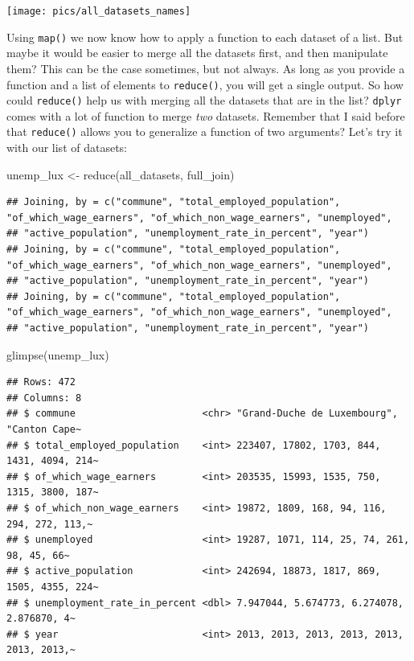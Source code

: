 \documentclass[
]{article}
\newenvironment{Shaded}{\begin{snugshade}}{\end{snugshade}}
\newcommand{\FunctionTok}[1]{\textcolor[rgb]{0.00,0.00,0.00}{#1}}
\newcommand{\NormalTok}[1]{#1}
\newcommand{\OtherTok}[1]{\textcolor[rgb]{0.56,0.35,0.01}{#1}}
\begin{document}
\texttt{[image: pics/all\_datasets\_names]}

Using \texttt{map()} we now know how to apply a function to each dataset of a list. But maybe it would be
easier to merge all the datasets first, and then manipulate them? This can be the case sometimes,
but not always.
As long as you provide a function and a list of elements to \texttt{reduce()}, you will get a single
output. So how could \texttt{reduce()} help us with merging all the datasets that are in the list? \texttt{dplyr}
comes with a lot of function to merge \emph{two} datasets. Remember that I said before that \texttt{reduce()}
allows you to generalize a function of two arguments? Let's try it with our list of datasets:

\begin{Shaded}
\begin{Highlighting}[]
\NormalTok{unemp\_lux }\OtherTok{\textless{}{-}} \FunctionTok{reduce}\NormalTok{(all\_datasets, full\_join)}
\end{Highlighting}
\end{Shaded}

\begin{verbatim}
## Joining, by = c("commune", "total_employed_population", "of_which_wage_earners", "of_which_non_wage_earners", "unemployed",
## "active_population", "unemployment_rate_in_percent", "year")
## Joining, by = c("commune", "total_employed_population", "of_which_wage_earners", "of_which_non_wage_earners", "unemployed",
## "active_population", "unemployment_rate_in_percent", "year")
## Joining, by = c("commune", "total_employed_population", "of_which_wage_earners", "of_which_non_wage_earners", "unemployed",
## "active_population", "unemployment_rate_in_percent", "year")
\end{verbatim}

\begin{Shaded}
\begin{Highlighting}[]
\FunctionTok{glimpse}\NormalTok{(unemp\_lux)}
\end{Highlighting}
\end{Shaded}

\begin{verbatim}
## Rows: 472
## Columns: 8
## $ commune                      <chr> "Grand-Duche de Luxembourg", "Canton Cape~
## $ total_employed_population    <int> 223407, 17802, 1703, 844, 1431, 4094, 214~
## $ of_which_wage_earners        <int> 203535, 15993, 1535, 750, 1315, 3800, 187~
## $ of_which_non_wage_earners    <int> 19872, 1809, 168, 94, 116, 294, 272, 113,~
## $ unemployed                   <int> 19287, 1071, 114, 25, 74, 261, 98, 45, 66~
## $ active_population            <int> 242694, 18873, 1817, 869, 1505, 4355, 224~
## $ unemployment_rate_in_percent <dbl> 7.947044, 5.674773, 6.274078, 2.876870, 4~
## $ year                         <int> 2013, 2013, 2013, 2013, 2013, 2013, 2013,~
\end{verbatim}
\end{document}
